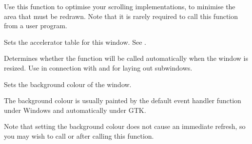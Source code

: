 
Use this function to optimise your scrolling implementations, to minimise the area that must be
redrawn. Note that it is rarely required to call this function from a user program.

\label{wxwindowsetacceleratortable}


Sets the accelerator table for this window. See .

\label{wxwindowsetautolayout}


Determines whether the  function will
be called automatically when the window is resized. Use in connection with 
 and 
 for laying out
subwindows.





\label{wxwindowsetbackgroundcolour}


Sets the background colour of the window.




The background colour is usually painted by the default\rtfsp
{} event handler function
under Windows and automatically under GTK.

Note that setting the background colour does not cause an immediate refresh, so you
may wish to call  or  after
calling this function.

